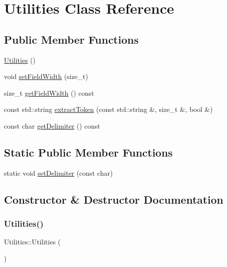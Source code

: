 \hypertarget{class_utilities}{}\section{Utilities Class Reference}
\label{class_utilities}
\subsection*{Public Member Functions}
\begin{DoxyCompactItemize}
\item 
\mbox{\hyperlink{class_utilities_ab1676c9ce35cf347a73d16f1094e1271}{Utilities}} ()
\item 
void \mbox{\hyperlink{class_utilities_ac988cf9fa28095c6e5e478364a7115af}{set\+Field\+Width}} (size\+\_\+t)
\item 
size\+\_\+t \mbox{\hyperlink{class_utilities_a4d76700f1ca78a0fcac71661ac05a137}{get\+Field\+Width}} () const
\item 
const std\+::string \mbox{\hyperlink{class_utilities_a965e959066042decc812c4e8b8602a7e}{extract\+Token}} (const std\+::string \&, size\+\_\+t \&, bool \&)
\item 
const char \mbox{\hyperlink{class_utilities_a8335fa01c68450eceb6f409fd6c2469d}{get\+Delimiter}} () const
\end{DoxyCompactItemize}
\subsection*{Static Public Member Functions}
\begin{DoxyCompactItemize}
\item 
static void \mbox{\hyperlink{class_utilities_a6961ff17f2a37332cff6ef51940b9c7b}{set\+Delimiter}} (const char)
\end{DoxyCompactItemize}


\subsection{Constructor \& Destructor Documentation}
\mbox{\label{class_utilities_ab1676c9ce35cf347a73d16f1094e1271}} 
\subsubsection{\texorpdfstring{Utilities()}{Utilities()}}
{\footnotesize\ttfamily Utilities\+::\+Utilities (\begin{DoxyParamCaption}{ }\end{DoxyParamCaption})}

